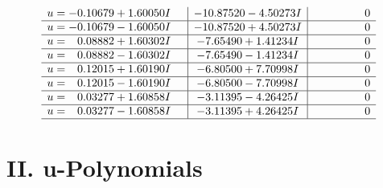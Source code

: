 \documentclass[1p]{elsarticle_modified}
\theoremstyle{definition}
\begin{document}
$$\begin{array}{c|c|c}
\begin{aligned}
u &= -0.10679 + 1.60050 I\end{aligned}
 & -10.87520 - 4.50273 I & \phantom{-0.000000 } 0 \\ \hline\begin{aligned}
u &= -0.10679 - 1.60050 I\end{aligned}
 & -10.87520 + 4.50273 I & \phantom{-0.000000 } 0 \\ \hline\begin{aligned}
u &= \phantom{-}0.08882 + 1.60302 I\end{aligned}
 & -7.65490 + 1.41234 I & \phantom{-0.000000 } 0 \\ \hline\begin{aligned}
u &= \phantom{-}0.08882 - 1.60302 I\end{aligned}
 & -7.65490 - 1.41234 I & \phantom{-0.000000 } 0 \\ \hline\begin{aligned}
u &= \phantom{-}0.12015 + 1.60190 I\end{aligned}
 & -6.80500 + 7.70998 I & \phantom{-0.000000 } 0 \\ \hline\begin{aligned}
u &= \phantom{-}0.12015 - 1.60190 I\end{aligned}
 & -6.80500 - 7.70998 I & \phantom{-0.000000 } 0 \\ \hline\begin{aligned}
u &= \phantom{-}0.03277 + 1.60858 I\end{aligned}
 & -3.11395 - 4.26425 I & \phantom{-0.000000 } 0 \\ \hline\begin{aligned}
u &= \phantom{-}0.03277 - 1.60858 I\end{aligned}
 & -3.11395 + 4.26425 I & \phantom{-0.000000 } 0\\
 \hline 
 \end{array}$$\newpage
\newpage\renewcommand{\arraystretch}{1}
\centering \section*{ II. u-Polynomials}
\end{document}
